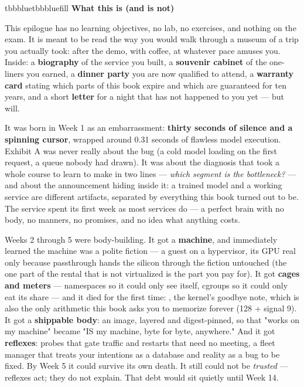 
\begin{calloutbox}{tbbblue}{tbbbluefill}
{\normalsize\bfseries\color{tbbblue}What this is (and is not)}\par\vspace{3pt}
This epilogue has no learning objectives, no lab, no exercises, and nothing on the exam. It is meant to be read the way you would walk through a museum of a trip you actually took: after the demo, with coffee, at whatever pace amuses you. Inside: a \textbf{biography} of the service you built, a \textbf{souvenir cabinet} of the one-liners you earned, a \textbf{dinner party} you are now qualified to attend, a \textbf{warranty card} stating which parts of this book expire and which are guaranteed for ten years, and a short \textbf{letter} for a night that has not happened to you yet — but will.
\end{calloutbox}

\vspace{4.0pt}


It was born in Week 1 as an embarrassment: \textbf{thirty seconds of silence and a spinning cursor}, wrapped around 0.31 seconds of flawless model execution. Exhibit A was never really about the bug (a cold model loading on the first request, a queue nobody had drawn). It was about the diagnosis that took a whole course to learn to make in two lines — \textit{which segment is the bottleneck?} — and about the announcement hiding inside it: a trained model and a working service are different artifacts, separated by everything this book turned out to be. The service spent its first week as most services do — a perfect brain with no body, no manners, no promises, and no idea what anything costs.

Weeks 2 through 5 were body-building. It got a \textbf{machine}, and immediately learned the machine was a polite fiction — a guest on a hypervisor, its GPU real only because passthrough hands the silicon through the fiction untouched (the one part of the rental that is not virtualized is the part you pay for). It got \textbf{cages and meters} — namespaces so it could only see itself, cgroups so it could only eat its share — and it died for the first time: , the kernel's goodbye note, which is also the only arithmetic this book asks you to memorize forever (128 + signal 9). It got a \textbf{shippable body}: an image, layered and digest-pinned, so that "works on my machine" became "IS my machine, byte for byte, anywhere." And it got \textbf{reflexes}: probes that gate traffic and restarts that need no meeting, a fleet manager that treats your intentions as a database and reality as a bug to be fixed. By Week 5 it could survive its own death. It still could not be \textit{trusted} — reflexes act; they do not explain. That debt would sit quietly until Week 14.

